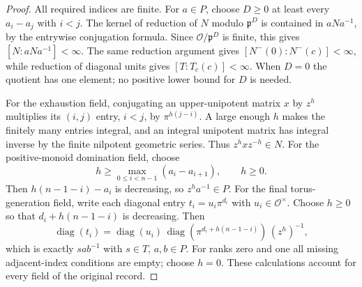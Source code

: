 \begin{proof}
All required indices are finite.  For $a\in P$, choose
$D\geq0$ at least every $a_i-a_j$ with $i<j$.
The kernel of reduction of $N$ modulo $\mathfrak p^D$
is contained in $aNa^{-1}$, by the entrywise conjugation
formula.  Since $\mathcal O/\mathfrak p^D$ is finite, this
gives $[N:aNa^{-1}]<\infty$.  The same reduction argument
gives $[N^-(0):N^-(c)]<\infty$, while reduction of diagonal
units gives $[T:T_c(c)]<\infty$.  When $D=0$ the quotient
has one element; no positive lower bound for $D$ is needed.

For the exhaustion field, conjugating an upper-unipotent
matrix $x$ by $z^h$ multiplies its $(i,j)$ entry, $i<j$,
by $\pi^{h(j-i)}$.  A large enough $h$ makes the finitely
many entries integral, and an integral unipotent matrix has
integral inverse by the finite nilpotent geometric series.
Thus $z^h xz^{-h}\in N$.  For the positive-monoid domination
field, choose
\[
          h\geq\max_{0\leq i<n-1}(a_i-a_{i+1}),\qquad h\geq0.
\]
Then $h(n-1-i)-a_i$ is decreasing, so $z^ha^{-1}\in P$.
For the final torus-generation field, write each diagonal
entry $t_i=u_i\pi^{d_i}$ with $u_i\in\mathcal O^\times$.
Choose $h\geq0$ so that $d_i+h(n-1-i)$ is decreasing.
Then
\[
 \operatorname{diag}(t_i)
 =\operatorname{diag}(u_i)\,
   \operatorname{diag}(\pi^{d_i+h(n-1-i)})\,(z^h)^{-1},
\]
which is exactly $s a b^{-1}$ with $s\in T$, $a,b\in P$.
For ranks zero and one all missing adjacent-index conditions
are empty; choose $h=0$.  These calculations account for every
field of the original record.
\end{proof}

